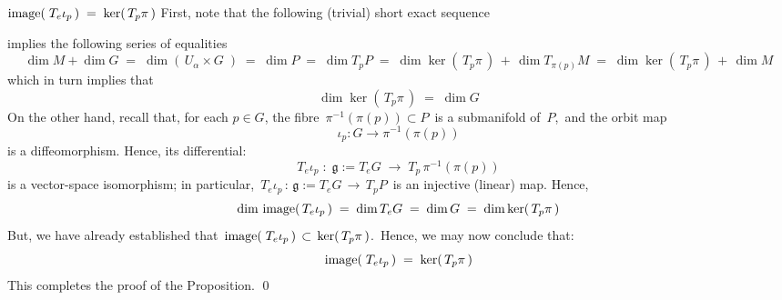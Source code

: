 \vskip 0.3cm
\noindent
\underline{$\textnormal{image}\!\left(\;T_{e}\iota_{p}\,\right) \;=\; \ker\!\left(\,T_{p}\pi\,\right)$}
\vskip 0.2cm
\noindent
First, note that the following (trivial) short exact sequence
\begin{center}
\end{center}
implies the following series of equalities
\begin{equation*}
\dim M + \dim G
\; = \;
	\dim\!\left(\,U_{\alpha} \times G\;\!\right)
\; = \;
	\dim P
\; = \; 
	\dim T_{p}P
\; = \; 
	\dim\ker\!\left(\,T_{p}\pi\,\right) \, + \, \dim T_{\pi(p)}M
\; = \; 
	\dim\ker\!\left(\,T_{p}\pi\,\right) \, + \, \dim M
\end{equation*}
which in turn implies that
\begin{equation*}
\dim\ker\!\left(\,T_{p}\pi\,\right) \; = \; \dim G
\end{equation*}
On the other hand, recall that, for each $p \in G$,
the fibre \,$\pi^{-1}(\pi(p)) \subset P$\, is a submanifold of \,$P$,\,
and the orbit map
\begin{equation*}
\iota_{p} : G \longrightarrow \pi^{-1}(\pi(p))
\end{equation*}
is a diffeomorphism. Hence, its differential:
\begin{equation*}
T_{e}\iota_{p} \; : \; \mathfrak{g} := T_{e}G \; \longrightarrow \; T_{p}\,\pi^{-1}(\pi(p))
\end{equation*}
is a vector-space isomorphism;
in particular, \,$T_{e}\iota_{p} \,:\, \mathfrak{g} := T_{e}G \,\longrightarrow\, T_{p}P$\, is an injective (linear) map.
Hence,
\begin{equation*}
\dim\,\textnormal{image}\!\left(\,T_{e}\iota_{p}\,\right) \;=\; \dim T_{e}G \;=\; \dim G \;=\; \dim\ker\!\left(\,T_{p}\pi\,\right)
\end{equation*}
But, we have already established that
\,$\textnormal{image}\!\left(\;T_{e}\iota_{p}\,\right) \,\subset\, \ker\!\left(\,T_{p}\pi\,\right)$.\,
Hence, we may now conclude that:
\begin{equation*}
\textnormal{image}\!\left(\;T_{e}\iota_{p}\,\right) \; = \;  \ker\!\left(\,T_{p}\pi\,\right)
\end{equation*}
This completes the proof of the Proposition.
\qed

